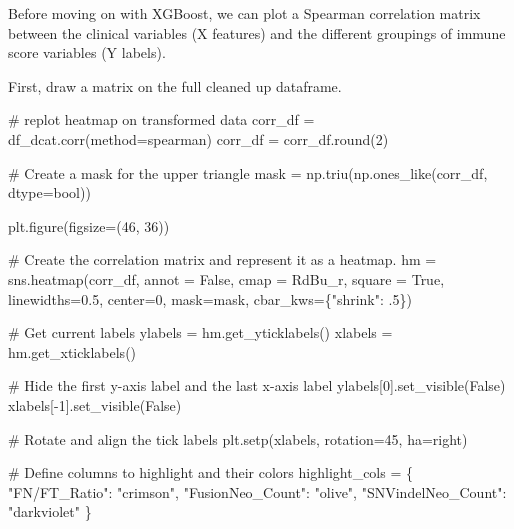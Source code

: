\documentclass[
  letterpaper,
  DIV=11,
  numbers=noendperiod]{scrartcl}
\newenvironment{Shaded}{\begin{snugshade}}{\end{snugshade}}
\newcommand{\BuiltInTok}[1]{\textcolor[rgb]{0.00,0.23,0.31}{#1}}
\newcommand{\CommentTok}[1]{\textcolor[rgb]{0.37,0.37,0.37}{#1}}
\newcommand{\DecValTok}[1]{\textcolor[rgb]{0.68,0.00,0.00}{#1}}
\newcommand{\FloatTok}[1]{\textcolor[rgb]{0.68,0.00,0.00}{#1}}
\newcommand{\NormalTok}[1]{\textcolor[rgb]{0.00,0.23,0.31}{#1}}
\newcommand{\OperatorTok}[1]{\textcolor[rgb]{0.37,0.37,0.37}{#1}}
\newcommand{\StringTok}[1]{\textcolor[rgb]{0.13,0.47,0.30}{#1}}
\newcommand{\VariableTok}[1]{\textcolor[rgb]{0.07,0.07,0.07}{#1}}
\begin{document}
Before moving on with XGBoost, we can plot a Spearman correlation matrix
between the clinical variables (X features) and the different groupings
of immune score variables (Y labels).

First, draw a matrix on the full cleaned up dataframe.

\begin{Shaded}
\begin{Highlighting}[]
\CommentTok{\# replot heatmap on transformed data}
\NormalTok{corr\_df }\OperatorTok{=}\NormalTok{ df\_dcat.corr(method}\OperatorTok{=}\StringTok{\textquotesingle{}spearman\textquotesingle{}}\NormalTok{)}
\NormalTok{corr\_df }\OperatorTok{=}\NormalTok{ corr\_df.}\BuiltInTok{round}\NormalTok{(}\DecValTok{2}\NormalTok{)}

\CommentTok{\# Create a mask for the upper triangle}
\NormalTok{mask }\OperatorTok{=}\NormalTok{ np.triu(np.ones\_like(corr\_df, dtype}\OperatorTok{=}\BuiltInTok{bool}\NormalTok{))}

\NormalTok{plt.figure(figsize}\OperatorTok{=}\NormalTok{(}\DecValTok{46}\NormalTok{, }\DecValTok{36}\NormalTok{))}

\CommentTok{\# Create the correlation matrix and represent it as a heatmap.}
\NormalTok{hm }\OperatorTok{=}\NormalTok{ sns.heatmap(corr\_df, annot }\OperatorTok{=} \VariableTok{False}\NormalTok{, cmap }\OperatorTok{=} \StringTok{\textquotesingle{}RdBu\_r\textquotesingle{}}\NormalTok{, square }\OperatorTok{=} \VariableTok{True}\NormalTok{, linewidths}\OperatorTok{=}\FloatTok{0.5}\NormalTok{, center}\OperatorTok{=}\DecValTok{0}\NormalTok{, mask}\OperatorTok{=}\NormalTok{mask, cbar\_kws}\OperatorTok{=}\NormalTok{\{}\StringTok{"shrink"}\NormalTok{: }\FloatTok{.5}\NormalTok{\})}

\CommentTok{\# Get current labels}
\NormalTok{ylabels }\OperatorTok{=}\NormalTok{ hm.get\_yticklabels()}
\NormalTok{xlabels }\OperatorTok{=}\NormalTok{ hm.get\_xticklabels()}

\CommentTok{\# Hide the first y{-}axis label and the last x{-}axis label}
\NormalTok{ylabels[}\DecValTok{0}\NormalTok{].set\_visible(}\VariableTok{False}\NormalTok{)}
\NormalTok{xlabels[}\OperatorTok{{-}}\DecValTok{1}\NormalTok{].set\_visible(}\VariableTok{False}\NormalTok{)}

\CommentTok{\# Rotate and align the tick labels}
\NormalTok{plt.setp(xlabels, rotation}\OperatorTok{=}\DecValTok{45}\NormalTok{, ha}\OperatorTok{=}\StringTok{\textquotesingle{}right\textquotesingle{}}\NormalTok{)}

\CommentTok{\# Define columns to highlight and their colors}
\NormalTok{highlight\_cols }\OperatorTok{=}\NormalTok{ \{}
    \StringTok{"FN/FT\_Ratio"}\NormalTok{: }\StringTok{"crimson"}\NormalTok{,}
    \StringTok{"FusionNeo\_Count"}\NormalTok{: }\StringTok{"olive"}\NormalTok{,}
    \StringTok{"SNVindelNeo\_Count"}\NormalTok{: }\StringTok{"darkviolet"}
\NormalTok{\}}


\end{Highlighting}
\end{Shaded}
\end{document}
